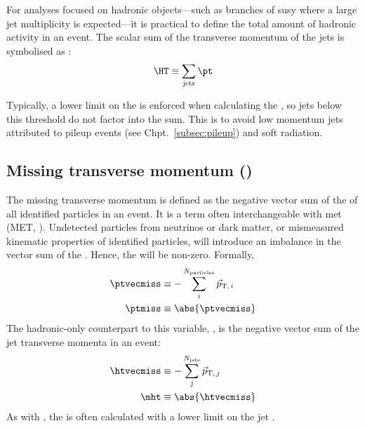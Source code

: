 For analyses focused on hadronic objects---such as branches of \acrlong{susy} where a large \gls{jet} multiplicity is expected---it is practical to define the total amount of hadronic activity in an event. The scalar sum of the transverse momentum of the \glspl{jet} is symbolised as \HT:
\begin{equation}
    \HT \equiv \sum_{\mathrm{jets}} \pt
    \label{eq:ht_definition}
\end{equation}

Typically, a lower limit on the \pt is enforced when calculating the \HT, so \glspl{jet} below this threshold do not factor into the sum. This is to avoid low momentum \glspl{jet} attributed to pileup events (see Chpt.~\ref{subsec:pileup}) and soft radiation.




\subsection{Missing transverse momentum (\texorpdfstring{\ptvecmiss}{ptmiss})}
\label{subsec:objects_met}

The missing transverse momentum \ptvecmiss is defined as the negative vector sum of the \ptvec of all identified particles in an event. It is a term often interchangeable with \gls{met} (MET, \VEtmiss). Undetected particles from neutrinos or dark matter, or mismeasured kinematic properties of identified particles, will introduce an imbalance in the vector sum of the \ptvec. Hence, the \ptvecmiss will be non-zero. Formally,
\begin{equation}
    \begin{aligned}
        \ptvecmiss &\equiv - \sum_i^{N_{\mathrm{particles}}} \vec{p}_{\mathrm{T}, \, i} \\
        \ptmiss &\equiv \abs{\ptvecmiss}
    \end{aligned}
    \label{eq:met_definition}
\end{equation}
The hadronic-only counterpart to this variable, \htvecmiss, is the negative vector sum of the \gls{jet} transverse momenta in an event:
\begin{equation}
    \begin{aligned}
        \htvecmiss &\equiv - \sum_j^{N_{\mathrm{jets}}} \vec{p}_{\mathrm{T}, \, j} \\
        \mht &\equiv \abs{\htvecmiss}
    \end{aligned}
    \label{eq:mht_definition}
\end{equation}
As with \HT, the \mht is often calculated with a lower limit on the \gls{jet} \pt.


